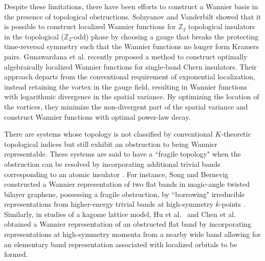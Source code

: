 \documentclass[galley,aps,pra,10pt,amsmath,amssymb,
    superscriptaddress,nofootinbib,longbibliography]{revtex4-2}
\begin{document}
Despite these limitations, there have been efforts to construct a Wannier basis in the presence of topological obstructions. Soluyanov and Vanderbilt \cite{soluyanov2011} showed that it is possible to construct localized Wannier functions for $\mathbb{Z}_2$ topological insulators in the topological ($\mathbb{Z}_2$-odd) phase by choosing a gauge that breaks the protecting time-reversal symmetry such that the Wannier functions no longer form Kramers pairs. Gunawardana et al. \cite{Gunawardana2024} recently proposed a method to construct optimally algebraically localized Wannier functions for single-band Chern insulators. Their approach departs from the conventional requirement of exponential localization, instead retaining the vortex in the gauge field, resulting in Wannier functions with logarithmic divergence in the spatial variance. By optimizing the location of the vortices, they minimize the non-divergent part of the spatial variance and construct Wannier functions with optimal power-law decay.


There are systems whose topology is not classified by conventional $K$-theoretic topological indices but still exhibit an obstruction to being Wannier representable. These systems are said to have a ``fragile topology" when the obstruction can be resolved by incorporating additional trivial bands corresponding to an atomic insulator \cite{bouhon2019, po2019, Po2018}. For instance, Song and Bernevig constructed a Wannier representation of two flat bands in magic-angle twisted bilayer graphene, possessing a fragile obstruction, by ``borrowing" irreducible representations from higher-energy trivial bands at high-symmetry $k$-points \cite{song2022}. Similarly, in studies of a kagome lattice model, Hu et al.~\cite{Hu2023} and Chen et al.~\cite{chen2023} obtained a Wannier representation of an obstructed flat band by incorporating representations at high-symmetry momenta from a nearby wide band allowing for an elementary band representation associated with localized orbitals to be formed. 
\end{document}
